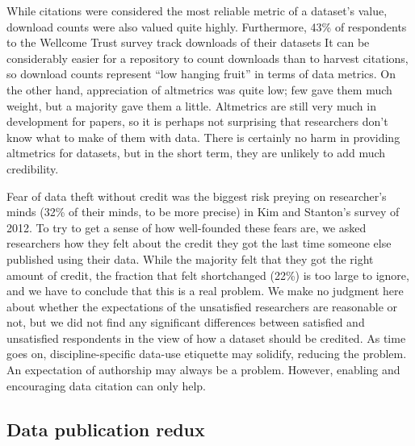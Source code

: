 \documentclass[10pt]{article}
\begin{document}
While citations were considered the most reliable metric of a dataset's value, download counts were also valued quite highly.
Furthermore, 43\% of respondents to the Wellcome Trust survey track downloads of their datasets\cite{bobrow_establishing_2014}
It can be considerably easier for a repository to count downloads than to harvest citations, so download counts represent ``low hanging fruit'' in terms of data metrics.
On the other hand, appreciation of altmetrics was quite low; few gave them much weight, but a majority gave them a little.
Altmetrics are still very much in development for papers, so it is perhaps not surprising that researchers don't know what to make of them with data.
There is certainly no harm in providing altmetrics for datasets, but in the short term, they are unlikely to add much credibility.

Fear of data theft without credit was the biggest risk preying on researcher's minds (32\% of their minds, to be more precise) in Kim and Stanton's survey of 2012.\cite{kim_institutional_2012}
To try to get a sense of how well-founded these fears are, we asked researchers how they felt about the credit they got the last time someone else published using their data.
While the majority felt that they got the right amount of credit, the fraction that felt shortchanged (22\%) is too large to ignore, and we have to conclude that this is a real problem.
We make no judgment here about whether the expectations of the unsatisfied researchers are reasonable or not, but we did not find any significant differences between satisfied and unsatisfied respondents in the view of how a dataset should be credited.
As time goes on, discipline-specific data-use etiquette may solidify, reducing the problem.
An expectation of authorship may always be a problem.
However, enabling and encouraging data citation can only help.  

\subsection*{Data publication redux}
\end{document}
